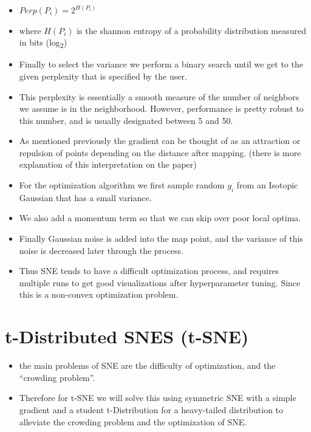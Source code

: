 \documentclass[11pt]{article}
\begin{document}
\begin{itemize}
\item \(Perp(P_i) = 2^{H(P_i)}\)
\item where \(H(P_i)\) is the shannon entropy of a probability distribution measured in bits (log\textsubscript{2})
\item Finally to select the variance we perform a binary search until we get to the given perplexity that is specified by the user.
\item This perplexity is essentially a smooth measure of the number of neighbors we assume is in the neighborhood. However, performance is pretty robust to this number, and is usually designated between 5 and 50.
\item As mentioned previously the gradient can be thought of as an attraction or repulsion of points depending on the distance after mapping. (there is more explanation of this interpretation on the paper)
\item For the optimization algorithm we first sample random \(y_i\) from an Isotopic Gaussian that has a small variance.
\item We also add a momentum term so that we can skip over poor local optima.
\item Finally Gaussian noise is added into the map point, and the variance of this noise is decreased later through the process.
\item Thus SNE tends to have a difficult optimization process, and requires multiple runs to get good visualizations after hyperparameter tuning. Since this is a non-convex optimization problem.
\end{itemize}
\section{t-Distributed SNES (t-SNE)}
\label{sec:orgd7d0cb6}
\begin{itemize}
\item the main problems of SNE are the difficulty of optimization, and the ``crowding problem''.
\item Therefore for t-SNE we will solve this using symmetric SNE with a simple gradient and a student t-Distribution for a heavy-tailed distribution to alleviate the crowding problem and the optimization of SNE.
\end{itemize}
\end{document}
